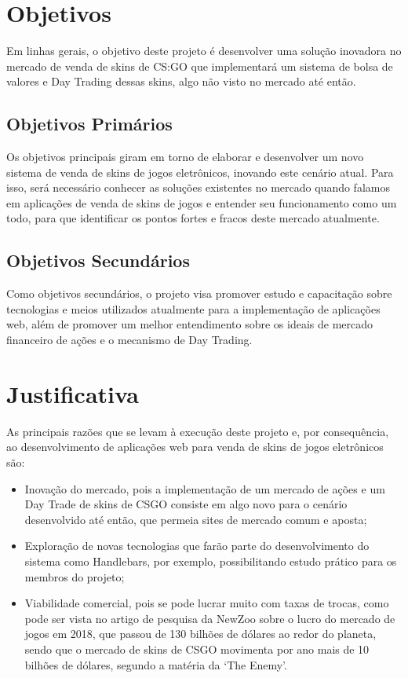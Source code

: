 \section{Objetivos}
Em linhas gerais, o objetivo deste projeto é desenvolver uma solução inovadora no mercado de venda de skins de CS:GO que implementará um sistema de bolsa de valores e Day Trading dessas skins, algo não visto no mercado até então.

\subsection{Objetivos Primários}
Os objetivos principais giram em torno de elaborar e desenvolver um novo sistema de venda de skins de jogos eletrônicos, inovando este cenário atual. Para isso, será necessário conhecer as soluções existentes no mercado quando falamos em aplicações de venda de skins de jogos e entender seu funcionamento como um todo, para que identificar os pontos fortes e fracos deste mercado atualmente.

\subsection{Objetivos Secundários}
Como objetivos secundários, o projeto visa promover estudo e capacitação sobre tecnologias e meios utilizados atualmente para a implementação de aplicações web, além de promover um melhor entendimento sobre os ideais de mercado financeiro de ações e o mecanismo de Day Trading.

\section{Justificativa}
As principais razões que se levam à execução deste projeto e, por consequência, ao desenvolvimento de aplicações web para venda de skins de jogos eletrônicos são: 

\begin{itemize}
	\item Inovação do mercado, pois a implementação de um mercado de ações e um Day Trade de skins de CSGO consiste em algo novo para o cenário desenvolvido até então, que permeia sites de mercado comum e aposta;
	\item Exploração de novas tecnologias que farão parte do desenvolvimento do sistema como Handlebars, por exemplo, possibilitando estudo prático para os membros do projeto;
	\item Viabilidade comercial, pois se pode lucrar muito com taxas de trocas, como pode ser vista no artigo de pesquisa da NewZoo sobre o lucro do mercado de jogos em 2018, que passou de 130 bilhões de dólares ao redor do planeta, sendo que o mercado de skins de CSGO movimenta por ano mais de 10 bilhões de dólares, segundo a matéria da ‘The Enemy’.
\end{itemize} 

